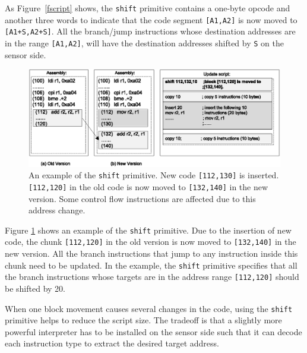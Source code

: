 As Figure~\ref{fscript} shows, the {\tt shift} primitive contains a one-byte opcode and another three words to indicate that
the code segment {\tt [A1,A2]} is now moved to {\tt [A1+S,A2+S]}. All the branch/jump instructions whose destination addresses are in the range {\tt [A1,A2]}, will have the destination addresses shifted by {\tt S} on the sensor side.


\begin{figure}[htbp]
\centering
\includegraphics[width=6in]{figures/shift.eps}
\caption[An example of the {\tt shift} primitive.]{An example of the {\tt shift} primitive. New code {\tt [112,130]} is inserted. {\tt [112,120]} in the old code is now moved to {\tt [132,140]} 
in the new version. Some control flow instructions are affected due to this address change.
}
\label{fshift}
\end{figure}

Figure \ref{fshift} shows an example of the {\tt shift} primitive. Due to the insertion of
new code, the chunk {\tt [112,120]} in the old version is now moved to {\tt [132,140]} 
in the new version. All the branch instructions that
jump to any instruction inside this chunk need to be updated. In the example, the {\tt shift} primitive
specifies that all the branch instructions whose targets are in the address range {\tt [112,120]} should be shifted by 20. 

When one block movement causes several changes in the code, using the {\tt shift} primitive helps to reduce the script size. The tradeoff is that a slightly more powerful interpreter has to be installed on the sensor side such that it can decode each instruction type to extract the desired target address. 


